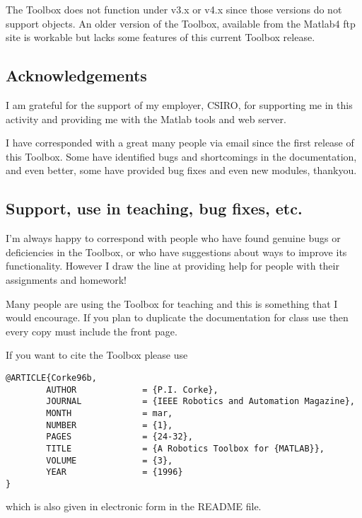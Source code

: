 \documentclass{article}
\begin{document}
The Toolbox does not function under {\Mlab} v3.x or v4.x since those versions
do not support objects.  An older version of the Toolbox, available from
the Matlab4 ftp site is workable but lacks some features of this current
Toolbox release.


\subsection{Acknowledgements}
I am grateful for the support of my employer, CSIRO, for supporting me in
this activity and providing me with the Matlab tools and web server.

I have corresponded with a great many people via email since the first 
release of this Toolbox.  Some have identified bugs and shortcomings
in the documentation, and even better, some have provided bug fixes and
even new modules, thankyou.

\subsection{Support, use in teaching, bug fixes, etc.}
I'm always happy to correspond with people who have found genuine
bugs or deficiencies
in the Toolbox, or who have suggestions about ways to improve its
functionality.  However I draw the line at providing help for people
with their assignments and homework!

Many people are using the Toolbox for teaching and this is something that
I would encourage.  If you plan to duplicate the documentation for class
use then every copy must include the front page.

If you want to cite the Toolbox please use
\begin{verbatim}
@ARTICLE{Corke96b,
        AUTHOR             = {P.I. Corke},
        JOURNAL            = {IEEE Robotics and Automation Magazine},
        MONTH              = mar,
        NUMBER             = {1},
        PAGES              = {24-32},
        TITLE              = {A Robotics Toolbox for {MATLAB}},
        VOLUME             = {3},
        YEAR               = {1996}
}
\end{verbatim}
which is also given in electronic form in the README file.
\end{document}
